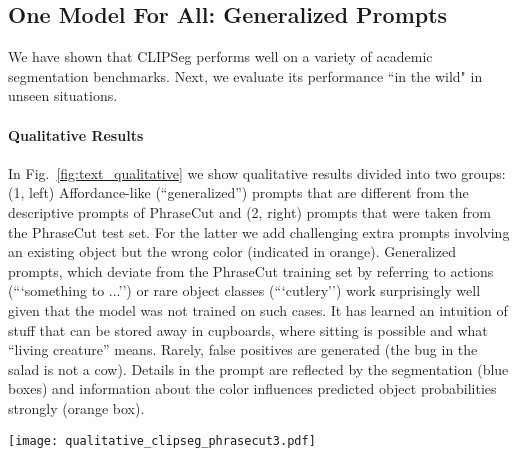 \subsection{One Model For All: Generalized Prompts}

\label{sec:generalize}

We have shown that CLIPSeg performs well on a variety of academic segmentation benchmarks. Next, we evaluate its performance ``in the wild" in unseen situations.

\paragraph{Qualitative Results}

In Fig.~\ref{fig:text_qualitative} we show qualitative results divided into two groups: (1, left) Affordance-like \cite{gibson66, gibson79} (``generalized'')  prompts that are different from the descriptive prompts of PhraseCut and (2, right) prompts that were taken from the PhraseCut test set. For the latter we add challenging extra prompts involving an existing object but the wrong color (indicated in orange). 
Generalized prompts, which deviate from the PhraseCut training set by referring to actions (```something to ...'') or rare object classes (```cutlery'') work surprisingly well given that the model was not trained on such cases. It has learned an intuition of stuff that can be stored away in cupboards, where sitting is possible and what ``living creature'' means. Rarely, false positives are generated (the bug in the salad is not a cow).
Details in the prompt are reflected by the segmentation (blue boxes) and information about the color influences predicted object probabilities strongly (orange box).

\begin{figure*}[tb]
    \centering
    \texttt{[image: qualitative\_clipseg\_phrasecut3.pdf]}
    \caption{Qualitative predictions of CLIPSeg (PC+) for various prompts, darkness indicates prediction strength. The generalized prompts (left) deviate from the PhraseCut prompts as they involve action-related properties or new object names.}
    \label{fig:text_qualitative}
\end{figure*}

